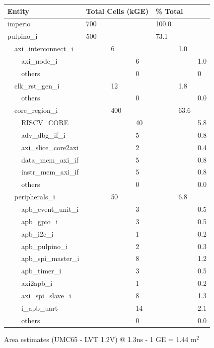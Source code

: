 \begin{figure}[ht!]
\centering
\begin{tabularx}{\textwidth}{Xllllll}
\textbf{Entity} &  \multicolumn{3}{l}{\textbf{Total Cells (kGE)}}  &  \multicolumn{3}{l}{\textbf{\% Total}}  \\\hline
imperio&700&&&100.0&&\\
pulpino\_i&500&&&73.1&&\\
$\quad$axi\_interconnect\_i&&6&&&1.0&\\
$\quad\quad$axi\_node\_i&&&6&&&1.0\\
$\quad\quad$others &&&0&&&0\\
$\quad$clk\_rst\_gen\_i&&12&&&1.8&\\
$\quad\quad$others &&&0&&&0.0\\
$\quad$core\_region\_i&&400&&&63.6&\\
$\quad\quad$RISCV\_CORE&&&40&&&5.8\\
$\quad\quad$adv\_dbg\_if\_i&&&5&&&0.8\\
$\quad\quad$axi\_slice\_core2axi&&&2&&&0.4\\
$\quad\quad$data\_mem\_axi\_if&&&5&&&0.8\\
$\quad\quad$instr\_mem\_axi\_if&&&5&&&0.8\\
$\quad\quad$others &&&0&&&0.0\\
$\quad$peripherals\_i&&50&&&6.8&\\
$\quad\quad$apb\_event\_unit\_i&&&3&&&0.5\\
$\quad\quad$apb\_gpio\_i&&&3&&&0.5\\
$\quad\quad$apb\_i2c\_i&&&1&&&0.2\\
$\quad\quad$apb\_pulpino\_i&&&2&&&0.3\\
$\quad\quad$apb\_spi\_master\_i&&&8&&&1.2\\
$\quad\quad$apb\_timer\_i&&&3&&&0.5\\
$\quad\quad$axi2apb\_i&&&1&&&0.2\\
$\quad\quad$axi\_spi\_slave\_i&&&8&&&1.3\\
$\quad\quad$i\_apb\_uart&&&14&&&2.1\\
$\quad\quad$others &&&0&&&0.0\\
\end{tabularx}
\caption{Area estimates (UMC65 - LVT 1.2V) @ 1.3ns - 1 GE = 1.44 \textmu m$^2$}
\label{fig:area}
\end{figure}

